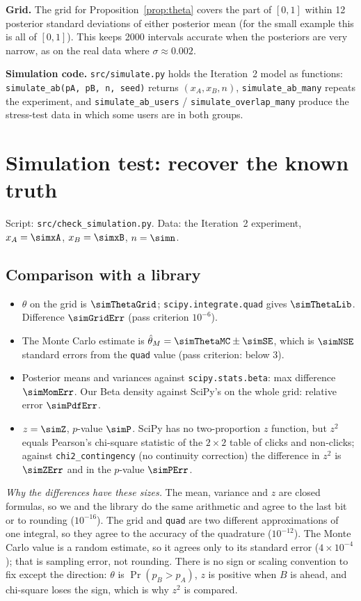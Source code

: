 \textbf{Grid.} The grid for Proposition~\ref{prop:theta} covers the part of $[0,1]$ within 12 posterior standard
deviations of either posterior mean (for the small example this is all of $[0,1]$). This keeps 2000 intervals
accurate when the posteriors are very narrow, as on the real data where $\sigma\approx0.002$.

\sloppy
\textbf{Simulation code.} \texttt{src/simulate.py} holds the Iteration~2 model as functions:
\texttt{simulate\_ab(pA, pB, n, seed)} returns $(x_A,x_B,n)$, \texttt{simulate\_ab\_many} repeats the experiment,
and \texttt{simulate\_ab\_users} / \texttt{simulate\_overlap\_many} produce the stress-test data in which some
users are in both groups.\par\fussy

\section{Simulation test: recover the known truth}\label{sec:it3-sim}

Script: \texttt{src/check\_simulation.py}. Data: the Iteration~2 experiment, $x_A=\simxA$, $x_B=\simxB$, $n=\simn$.

\subsection{Comparison with a library}
\begin{itemize}[nosep]
\item $\theta$ on the grid is $\simThetaGrid$; \texttt{scipy.integrate.quad} gives $\simThetaLib$. Difference $\simGridErr$
  (pass criterion $10^{-6}$).
\item The Monte Carlo estimate is $\hat\theta_M=\simThetaMC\pm\simSE$, which is $\simNSE$ standard errors from the
  \texttt{quad} value (pass criterion: below 3).
\item Posterior means and variances against \texttt{scipy.stats.beta}: max difference $\simMomErr$. Our Beta density
  against SciPy's on the whole grid: relative error $\simPdfErr$.
\item $z=\simZ$, $p$-value $\simP$. SciPy has no two-proportion $z$ function, but $z^2$ equals Pearson's chi-square
  statistic of the $2\times2$ table of clicks and non-clicks; against \texttt{chi2\_contingency} (no continuity
  correction) the difference in $z^2$ is $\simZErr$ and in the $p$-value $\simPErr$.
\end{itemize}
\emph{Why the differences have these sizes.} The mean, variance and $z$ are closed formulas, so we and the library
do the same arithmetic and agree to the last bit or to rounding ($10^{-16}$). The grid and \texttt{quad} are two
different approximations of one integral, so they agree to the accuracy of the quadrature ($10^{-12}$). The Monte
Carlo value is a random estimate, so it agrees only to its standard error ($4\times10^{-4}$); that is sampling
error, not rounding. There is no sign or scaling convention to fix except the direction: $\theta$ is
$\Pr(p_B>p_A)$, $z$ is positive when $B$ is ahead, and chi-square loses the sign, which is why $z^2$ is compared.

